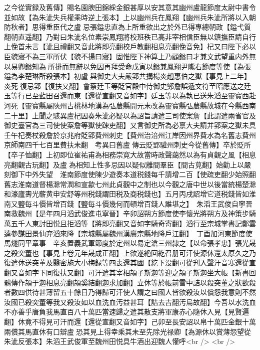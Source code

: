 之今從實録及舊傳】賜名園腴田錦綵金銀甚厚以安其意其幽州盧龍節度太尉中書令並如故【為朱泚失兵權乘時逆上張本】上以幽州兵在鳳翔【幽州兵朱泚所將以入朝防秋者】思得重臣代之盧忌張鎰忠直為上所重欲出之於外已得專總朝政【鎰弋質翻朝直遥翻】乃對曰朱泚名位素崇鳳翔將校班秩已高非宰相信臣無以鎮撫臣請自行上俛首未言【泚且禮翻又音此將即亮翻校戶教翻相息亮翻俛音免】杞又曰陛下必以臣貌寢不為三軍所伏【貌不揚曰寢】固惟陛下神算上乃顧鎰曰才兼文武望重内外無以易卿鎰知為所排而無辭以免因再拜受命戊寅以鎰兼鳳翔尹隴右節度等使【為張鎰為李楚琳所殺張本】初盧與御史大夫嚴郢共搆楊炎趙惠伯之獄【事見上二年】炎死復忌郢【復扶又翻】會蔡廷玉等貶官殿中侍御史鄭詹誤遞文符至昭應送之廷玉等行已至藍田召還而東【還從宣翻又音如字】廷玉等以為執已送朱滔至靈寶西赴河死【靈寶縣屬陜州古桃林地漢為弘農縣開元末改為靈寶縣弘農縣故城在今縣西南二十里】上聞之駭異盧杞因奏朱泚必疑以為詔旨請遣三司使案詹【此謂遣兩省官及御史臺官為三司使使案詹等獄使踈吏翻】又言御史所為必禀大夫請并郢案之獄未具壬午杞奏杖殺詹於京兆府貶郢費州刺史【費州治涪州江岸因州界費水為名舊志費州京師南四千七百里費扶未翻　考異曰舊盧傳云貶郢驩州刺史今從舊傳】卒於貶所【卒子恤翻】上初即位崔祐甫為相務崇寛大故當時政聲藹然以為有貞觀之風【相息亮翻觀古玩翻】及盧為相知上性多忌因以疑似離間羣臣【間古莧翻】始勸上以嚴刻御下中外失望　淮南節度使陳少遊奏本道税錢每千請增二百【使疏吏翻少始照翻舊志淮南道督楊滁常潤和宣歙七州此貞觀中之制也以今觀之唐中世以後當統楊楚滁和濠廬夀光蘄黄申安舒等州税錢謂田税及商税錢也】五月丙戌詔增它道税錢皆如淮南又鹽每斗價皆增百錢【鹽每斗價幾何而頓增百錢人誰堪之】　朱滔王武俊自寧晉南救魏州【是年四月滔武俊進屯寧晉】辛卯詔朔方節度使李懷光將朔方及神策步騎萬五千人東討田悦且拒滔等【將即亮翻又音如字騎奇寄翻】滔行至宗城掌書記鄭雲逵參謀田景仙弃滔來降【宗城縣屬魏州漢廣宗縣地降戶江翻】　丁酉加河東節度使馬燧同平章事　辛亥置義武軍節度於定州以易定滄三州隸之【以命張孝忠】張光晟之殺突董也【事見上卷元年晟成正翻】上欲遂絶回紇召册可汗使源休還太原久之乃復遣休送突董及翳密施大小梅録等四喪還其國【紇下没翻可從刋入聲汗音寒還從宣翻又音如字下同復扶又翻】可汗遣其宰相頡子斯迦等迎之頡子斯迦坐大帳【新書回鶻傳作頡于迦相息亮翻頡奚結翻迦求加翻】立休等於帳前雪中詰以殺突董之狀欲殺者數四供待甚薄留五十餘日乃得歸可汗使人謂之曰國人皆欲殺汝以償怨我意則不然汝國已殺突董等我又殺汝如以血洗血汚益甚耳【詰去吉翻汚烏故翻】今吾以水洗血不亦善乎唐負我馬直百八十萬匹當速歸之遣其散支將軍康赤心隨休入見【見賢遍翻】休竟不得見可汗而還【還從宣翻又音如字】己卯至長安詔以帛十萬匹金銀十萬兩償其馬直休有口辯盧恐其見上得幸乘其未至先除光禄卿【為源休以賞薄怨望從朱泚反張本】朱滔王武俊軍至魏州田悦具牛酒出迎魏人懽呼<br />
<br />

